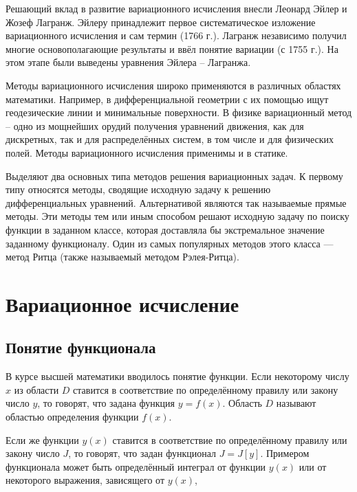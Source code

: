 \documentclass{article}
\begin{document}
Решающий вклад в развитие вариационного исчисления внесли Леонард Эйлер и Жозеф Лагранж. Эйлеру принадлежит первое систематическое изложение вариационного исчисления и сам термин (1766 г.). Лагранж независимо получил многие основополагающие результаты и ввёл понятие вариации (с 1755 г.). На этом этапе были выведены уравнения Эйлера – Лагранжа.

Методы вариационного исчисления широко применяются в различных областях математики. Например, в дифференциальной геометрии с их помощью ищут геодезические линии и минимальные поверхности. В физике вариационный метод – одно из мощнейших орудий получения уравнений движения, как для дискретных, так и для распределённых систем, в том числе и для физических полей. Методы вариационного исчисления применимы и в статике.

Выделяют два основных типа методов решения вариационных задач. К первому типу относятся методы, сводящие исходную задачу к решению дифференциальных уравнений. Альтернативой являются так называемые прямые методы. Эти методы тем или иным способом решают исходную задачу по поиску функции в заданном классе, которая доставляла бы экстремальное значение заданному функционалу. Один из самых популярных методов этого класса — метод Ритца (также называемый методом Рэлея-Ритца).


\section{Вариационное исчисление}

\subsection{Понятие функционала}

В курсе высшей математики вводилось понятие функции. Если некоторому числу $x$ из области $D$ ставится в соответствие по определённому правилу или закону число $y$, то говорят, что задана функция $y=f(x)$. Область $D$ называют областью определения функции $f(x)$.

Если же функции $y(x)$ ставится в соответствие по определённому правилу или закону число $J$, то говорят, что задан функционал $J = J[y]$. Примером функционала может быть определённый интеграл от функции $y(x)$ или от некоторого выражения, зависящего от $y(x)$,
\end{document}
